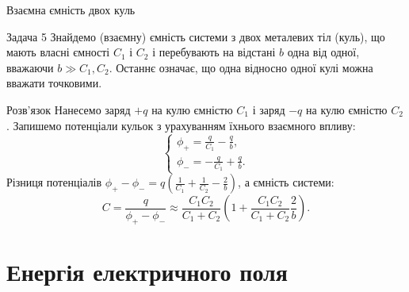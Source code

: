 \documentclass[onlytextwidth]{beamer}
\begin{document}
\begin{frame}{Взаємна ємність двох куль}{}\small
	\begin{exampleblock}{Задача 5}\justifying
		Знайдемо (взаємну) ємність системи з двох металевих тіл (куль), що мають власні ємності
		$C_1$ і $C_2$ і перебувають на відстані $b$ одна від одної, вважаючи $b \gg C_1,C_2$.
		Останнє означає, що одна відносно одної кулі можна вважати точковими.
	\end{exampleblock}
	\begin{center}
	\end{center}
	\begin{block}{Розв'язок}\justifying
		Нанесемо заряд $+q$ на кулю ємністю $C_1$ і заряд $-q$ на кулю ємністю $C_2$. Запишемо
		потенціали кульок з урахуванням їхнього взаємного впливу:
		\begin{equation*}
			\begin{cases}
				\phi_+ = \frac{q}{C_1} - \frac{q}{b}, \\
				\phi_- = -\frac{q}{C_1} + \frac{q}{b}.
			\end{cases}
		\end{equation*}
		Різниця потенціалів $\phi_+ - \phi_- = q\left( \frac1{C_1} + \frac1{C_2} - \frac2b\right) $, а
		ємність системи:
		\begin{equation*}
			C = \frac{q}{\phi_+ - \phi_-} \approx \frac{C_1C_2}{C_1 + C_2} \left(1 + \frac{C_1C_2}{C_1 +
				C_2}\frac2{b} \right) .
		\end{equation*}
	\end{block}
\end{frame}


\section{Енергія електричного поля}
\end{document}
